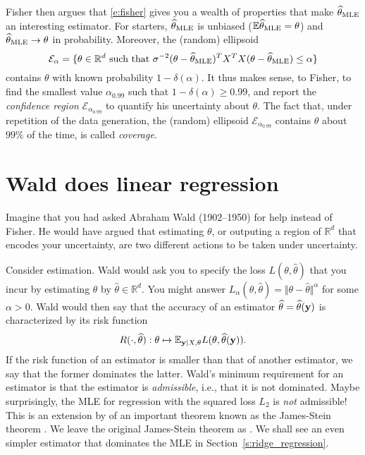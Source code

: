 Fisher then argues that \eqref{e:fisher} gives you a wealth of properties that make $\widehat{\theta}_{\text{MLE}}$ an interesting estimator.
For starters, $\widehat{\theta}_{\text{MLE}}$ is unbiased ($\mathbb E \widehat{\theta}_{\text{MLE}} = \theta$)
and $\widehat{\theta}_{\text{MLE}} \rightarrow \theta$ in probability. 
Moreover, the (random) ellipsoid 
$$
\mathcal{E}_\alpha = \{\theta\in\mathbb{R}^d \text{ such that }\sigma^{-2}(\theta-\widehat{\theta}_{\text{MLE}})^TX^T X(\theta-\widehat{\theta}_{\text{MLE}}) \leq \alpha\} 
$$
contains $\theta$ with known probability $1-\delta(\alpha)$.
It thus makes sense, to Fisher, to find the smallest value $\alpha_{0.99}$ such that $1-\delta(\alpha)\geq 0.99$, and report the \emph{confidence region} $\mathcal{E}_{\alpha_0.99}$ to quantify his uncertainty about $\theta$. 
The fact that, under repetition of the data generation, the (random) ellipsoid $\mathcal{E}_{\alpha_0.99}$ contains $\theta$ about $99\%$ of the time, is called \emph{coverage}.

\section{Wald does linear regression}
Imagine that you had asked Abraham Wald (1902--1950) for help instead of Fisher.
He would have argued that estimating $\theta$, or outputing a region of $\mathbb{R}^d$ that encodes your uncertainty, are two different actions to be taken under uncertainty. 

Consider estimation. 
Wald would ask you to specify the loss $L(\theta,\widehat{\theta})$ that you incur by estimating $\theta$ by $\widehat{\theta}\in\mathbb{R}^d$. 
You might answer $L_\alpha(\theta,\widehat{\theta}) = \Vert\theta-\widehat{\theta}\Vert^\alpha$ for some $\alpha>0$.
Wald would then say that the accuracy of an estimator $\widehat{\theta}= \widehat{\theta}(\mathbf{y})$ is characterized by its risk function
\begin{equation}
    R(\cdot,\widehat{\theta}):\theta\mapsto \mathbb{E}_{\mathbf{y}\vert X, \theta} L(\theta,\widehat{\theta}(\mathbf{y})).
    \label{e:risk}
\end{equation}
If the risk function of an estimator is smaller than that of another estimator, we say that the former dominates the latter.
Wald's minimum requirement for an estimator is that the estimator is \emph{admissible}, i.e., that it is not dominated. 
Maybe surprisingly, the MLE for regression with the squared loss $L_2$ is \emph{not} admissible! 
This is an extension by \cite{TBC} of an important theorem known as the James-Stein theorem \citep{TBC}.
We leave the original James-Stein theorem as . 
We shall see an even simpler estimator that dominates the MLE in Section~\ref{s:ridge_regression}.

